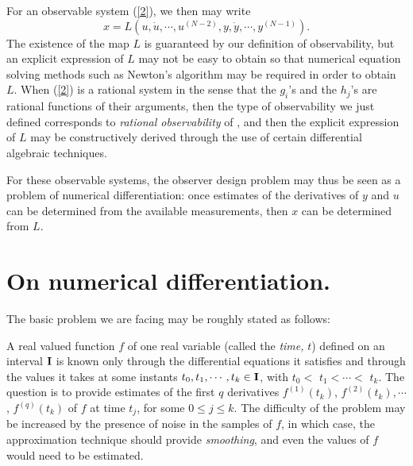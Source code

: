 For an observable system (\ref{2}), we then may write
$$x = L\left(u, \dot u, \cdots, u^{(N-2)}, y, \dot y, \cdots, y^{(N-1)} 
\right).$$
The existence of the map $L$ is guaranteed by our definition of 
observability, but an explicit expression of $L$ may not be easy to 
obtain so that numerical equation solving methods such as Newton's algorithm
may be required in order to obtain $L$.  
When (\ref{2}) is a rational system in the sense that the $g_i$'s and the 
$h_j$'s are rational functions of their arguments, then the type of 
observability we just defined corresponds to {\it rational 
observability} of \cite{diop1991d,diop1992b}, and then the explicit
expression of $L$ may be  constructively derived through the use of certain
differential
algebraic techniques.


For these observable systems, the observer design problem may thus be 
seen as a problem of numerical differentiation: once estimates of the
derivatives
of $y$ and $u$ can be determined from the available measurements, then $x$ can be
determined from $L$.

\section{On numerical differentiation.}\setcounter{equation}{0}
\label{numdiff}

The basic problem we are facing may be roughly stated as follows:

A real valued function $f$ of one real variable
(called the  {\it time,} $t$) defined on an interval ${\bf I}$ is known
only through the differential equations it satisfies and through the
values it  takes at some instants $t_0, t_1, \cdots, t_k \in {\bf I}$,
with $t_0 <$ $t_1 < \cdots <$ $t_k$.  The question is to provide
estimates of the first  $q$ derivatives $f^{(1)}(t_k)$,
$f^{(2)}(t_k), \cdots$, $f^{(q)}(t_k)$ of $f$ at time $t_j$, for some $0 \le j
\le k$.
The difficulty of the problem may be increased by the presence of noise in the samples
of $f$, in which case, the approximation technique should provide
{\it smoothing}, and even the values of $f$ would need to be estimated.


